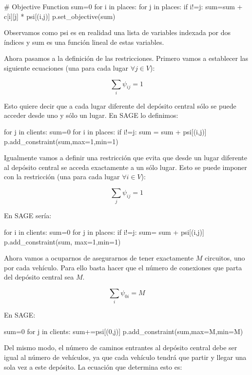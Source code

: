\documentclass{article}
\begin{document}
\begin{sageblock}
# Objective Function
sum=0
for i in places:
   for j in places:
      if i!=j:
         sum=sum + c[i][j] * psi[(i,j)]
p.set_objective(sum)
\end{sageblock}

Observamos como psi es en realidad una lista de variables indexada por dos índices y sum es una función lineal de estas variables.

Ahora pasamos a la definición de las restricciones. Primero vamos a establecer las siguiente ecuaciones (una para cada lugar $\forall j \in V$):

$$\sum_i \psi_{ij} = 1$$

Esto quiere decir que a cada lugar diferente del depósito central sólo se puede acceder desde uno y sólo un lugar. En SAGE lo definimos:

\begin{sageblock}
for j in clients:
    sum=0
    for i in places:
        if i!=j:
            sum = sum + psi[(i,j)]
    p.add_constraint(sum,max=1,min=1)
\end{sageblock}

Igualmente vamos a definir una restricción que evita que desde un lugar diferente al depósito central se acceda exactamente a un sólo lugar. Esto se puede imponer con la restricción (una para cada lugar $\forall i \in V$):

$$\sum_j \psi_{ij} = 1$$

En SAGE sería:

\begin{sageblock}
for i in clients:
    sum=0
    for j in places:
        if i!=j:
            sum= sum + psi[(i,j)]
    p.add_constraint(sum, max=1,min=1)
\end{sageblock}

Ahora vamos a ocuparnos de asegurarnos de tener exactamente $M$ circuitos, uno por cada vehículo. Para ello basta hacer que el número de conexiones que parta del depósito central sea $M$.

$$\sum_i \psi_{0i}=M$$

En SAGE:

\begin{sageblock}
sum=0
for j in clients:
    sum+=psi[(0,j)]
p.add_constraint(sum,max=M,min=M)
\end{sageblock}

Del mismo modo, el número de caminos entrantes al depósito central debe ser igual al número de vehículos, ya que cada vehículo tendrá que partir y llegar una sola vez a este depósito. La ecuación que determina esto es:
\end{document}
